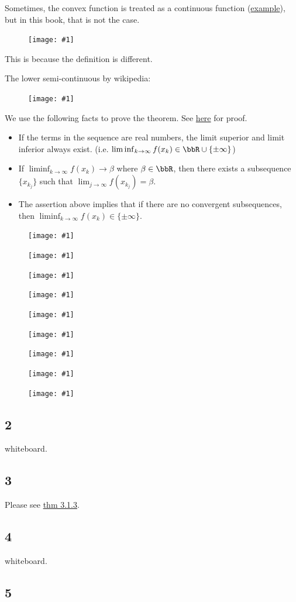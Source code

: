 \documentclass[a4paper, 14pt, dvipdfmx]{extarticle}
\newcommand{\IMG}[2]{
    \begin{figure}[H]
        \centering
        \texttt{[image: \#1]}
    \end{figure}
}
\begin{document}
Sometimes, the convex function is treated as a continuous function (\href{https://mathlandscape.com/convex-func}{example}), but in this book, that is not the case.

\IMG{convexIsContinuous.png}{0.8}

This is because the definition is different.

The lower semi-continuous by wikipedia:
\IMG{lowerSemiContinuous.png}{0.5}

We use the following facts to prove the theorem.
See \href{https://mathlandscape.com/limsup-liminf/}{here} for proof.
\begin{itemize}
    \item If the terms in the sequence are real numbers, the limit superior and limit inferior always exist.
          (i.e. $\liminf_{k\to\infty} f(x_k) \in \bbR \cup \{\pm\infty\}$)
    \item If $\liminf_{k\to\infty} f(x_k) \to \beta$ where $\beta \in \bbR$, then there exists a subsequence $\{ x_{k_j} \}$ such that $\lim_{j\to\infty} f(x_{k_j}) = \beta$.
    \item The assertion above implies that if there are no convergent subsequences, then $\liminf_{k\to\infty} f(x_k) \in \{\pm\infty\}$.
\end{itemize}

\IMG{img0.png}{0.8}
\IMG{img1.png}{0.8}
\IMG{img2.png}{0.8}
\IMG{img3.png}{0.8}
\IMG{img4.png}{0.8}
\IMG{img5.png}{0.8}

\IMG{psi.png}{0.8}

\IMG{why_interval_1.pdf}{0.8}
\IMG{why_interval_2.png}{0.8}

\subsection*{2}

whiteboard.

\subsection*{3}

Please see \href{thm:3.1.3}{thm 3.1.3}.

\subsection*{4}

whiteboard.

\subsection*{5}
\end{document}
